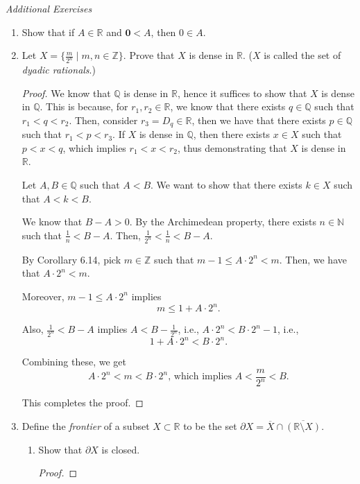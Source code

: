 \documentclass[11pt]{article}
\newcommand{\bbN}{\mathbb{N}}
\newcommand{\bbQ}{\mathbb{Q}}
\newcommand{\bbR}{\mathbb{R}}
\newcommand{\bbZ}{\mathbb{Z}}
\theoremstyle{definition}
\numberwithin{equation}{subsection}
\begin{document}
\bigskip


\begin{center}
{\em Additional Exercises}
\end{center}

\begin{enumerate}
\item
	Show that if $A \in \bbR$ and $\mathbf{0} < A$, then $0 \in A$.
	
\item Let $X=\{\frac{m}{2^n}\mid m,n\in\bbZ\}.$ Prove that $X$ is dense in $\bbR.$  ($X$ is called the set of {\em dyadic rationals}.)	

\begin{proof}
We know that $\bbQ$ is dense in $\bbR$, hence it suffices to show that $X$ is dense in $\bbQ$. This is because, for $r_1, r_2 \in \bbR$, we know that there exists $q \in \bbQ$ such that $r_1<q<r_2$. Then, consider $r_3 = D_q \in \bbR$, then we have that there exists $p \in \bbQ$ such that $r_1<p<r_3$. If $X$ is dense in $\bbQ$, then there exists $x \in X$ such that $p<x<q$, which implies $r_1<x<r_2$, thus demonstrating that $X$ is dense in $\bbR$. 

Let $A, B \in \bbQ$ such that $A<B$. We want to show that there exists $k \in X$ such that $A<k<B$.

We know that $B - A >0$. By the Archimedean property, there exists $n \in \bbN$ such that $\frac{1}{n}<B-A$. Then, $\frac{1}{2^n}<\frac{1}{n}<B-A$. 

By Corollary 6.14, pick $m \in \bbZ$ such that $m-1 \leq A \cdot 2^n < m$. Then, we have that $A \cdot 2^n < m$. 

Moreover, $m-1\leq A \cdot 2^n$ implies \[
m\leq 1+ A \cdot 2^n.
\]

Also, $\frac{1}{2^n}<B-A$ implies $A < B - \frac{1}{2^n}$, i.e., $A \cdot 2^n < B \cdot 2^n -1$, i.e., \[
1+A \cdot 2^n < B \cdot 2^n.
\]

Combining these, we get \[
A\cdot 2^n<m<B\cdot 2^n \text{, which implies } A < \frac{m}{2^n} <B.
\]

This completes the proof.

\renewcommand\qedsymbol{QED}
\end{proof}


\item 	
Define the {\em frontier} of a subset $X\subset \bbR$ to be the set $\partial X=\overline{X}\cap \overline{(\bbR\setminus X)}.$
\begin{enumerate}
\item Show that $\partial X$ is closed.
\begin{proof}


\end{proof}
\end{enumerate}
\end{enumerate}
\end{document}
